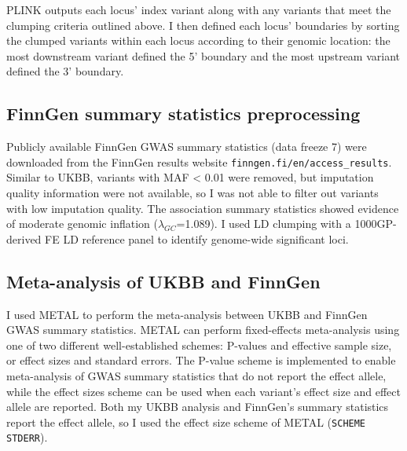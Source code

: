 PLINK outputs each locus' index variant along with any variants that meet the clumping criteria outlined above. I then defined each locus' boundaries by sorting the clumped variants within each locus according to their genomic location: the most downstream variant defined the 5' boundary and the most upstream variant defined the 3' boundary. 

\subsection{FinnGen summary statistics preprocessing}
Publicly available FinnGen GWAS summary statistics (data freeze 7) were downloaded from the FinnGen results website \Verb+finngen.fi/en/access_results+. Similar to UKBB, variants with MAF < 0.01 were removed, but imputation quality information were not available, so I was not able to filter out variants with low imputation quality. The association summary statistics showed evidence of moderate genomic inflation ($\lambda_{GC}$=1.089). I used LD clumping with a 1000GP-derived FE LD reference panel to identify genome-wide significant loci. 

\subsection{Meta-analysis of UKBB and FinnGen}
I used METAL to perform the meta-analysis between UKBB and FinnGen GWAS summary statistics.  METAL can perform fixed-effects meta-analysis using one of two different well-established schemes: P-values and effective sample size, or effect sizes and standard errors. The P-value scheme is implemented to enable meta-analysis of GWAS summary statistics that do not report the effect allele, while the effect sizes scheme can be used when each variant's effect size and effect allele are reported. Both my UKBB analysis and FinnGen's summary statistics report the effect allele, so I used the effect size scheme of METAL (\Verb+SCHEME STDERR+). \\



